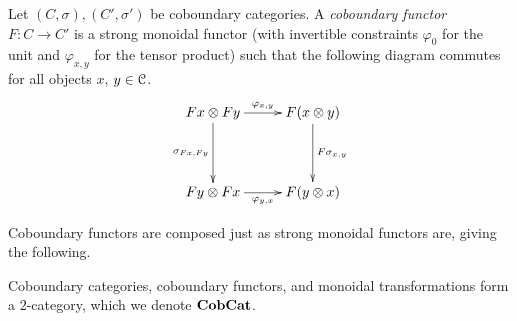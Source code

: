\begin{Defi}
Let $(C,\sigma), (C', \sigma')$ be coboundary categories. A \emph{coboundary functor} $F \colon C \rightarrow C'$ is a strong monoidal functor (with invertible constraints $\varphi_{0}$ for the unit and $\varphi_{x,y}$ for the tensor product) such that the following diagram commutes for all objects $x$, $y \in \mathcal{C}$.
  \[
    \xy
      (0,0)*+{Fx \otimes Fy}="00";
      (25,0)*+{F(x \otimes y)}="10";
      (0,-20)*+{Fy \otimes Fx}="01";
      (25,-20)*+{F(y \otimes x)}="11";
      {\ar^{\varphi_{x,y}} "00";"10"};
      {\ar^{F\sigma_{x,y}} "10";"11"};
      {\ar_{\sigma_{Fx,Fy}} "00";"01"};
      {\ar_{\varphi_{y,x}} "01";"11"};
    \endxy
  \]
\end{Defi}

Coboundary functors are composed just as strong monoidal functors are, giving the following.

\begin{lem}
Coboundary categories, coboundary functors, and monoidal transformations form a $2$-category, which we denote $\mathbf{CobCat}$.
\end{lem}


